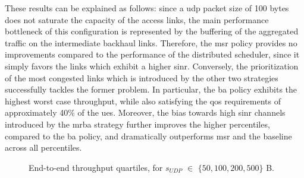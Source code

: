 These results can be explained as follows: since a \gls{udp} packet size of 100 bytes does not saturate the capacity of the access links, the main performance bottleneck of this configuration is represented by the buffering of the aggregated traffic on the intermediate backhaul links. Therefore, the \gls{msr} policy provides no improvements compared to the performance of the distributed scheduler, since it simply favors the links which exhibit a higher \gls{sinr}. Conversely, the prioritization of the most congested links which is introduced by the other two strategies successfully tackles the former problem. 
In particular, the \gls{ba} policy exhibits the highest worst case throughput, while also satisfying the \gls{qos} requirements of approximately 40\% of the \glspl{ue}. Moreover, the bias towards high \gls{sinr} channels introduced by the \gls{mrba} strategy further improves the higher percentiles, compared to the \gls{ba} policy, and dramatically outperforms \gls{msr} and the baseline across all percentiles. 
\begin{figure}[tbp]
  \centering
  \hfill
{}
   \caption{End-to-end throughput quartiles, for $s_{UDP}$ $\in$ $\{50, 100, 200, 500 \}$ B.}
  \label{Fig:Throughput_quartiles}
  \vspace{-.6cm} 
\end{figure}

